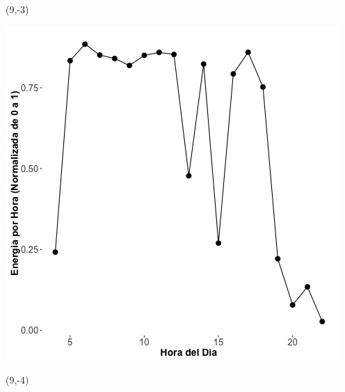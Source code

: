 \documentclass{article}\usepackage[]{graphicx}\usepackage[]{color}
\newenvironment{knitrout}{}{} %
\begin{document}
 \begin{textblock}{1}(9,-3)
\begin{minipage}{20em}
\begingroup

\endgroup
\end{minipage}
\end{textblock}

 \vspace{2cm}

\begin{knitrout}
\color{fgcolor}
\includegraphics[scale=0.75]{figure/A14_fplot_norm_median} 
\end{knitrout}


 \begin{textblock}{1}(9,-4)
\begin{minipage}{20em}
\begingroup

\endgroup
\end{minipage}
\end{textblock}

 \vspace{2cm}
\end{document}
